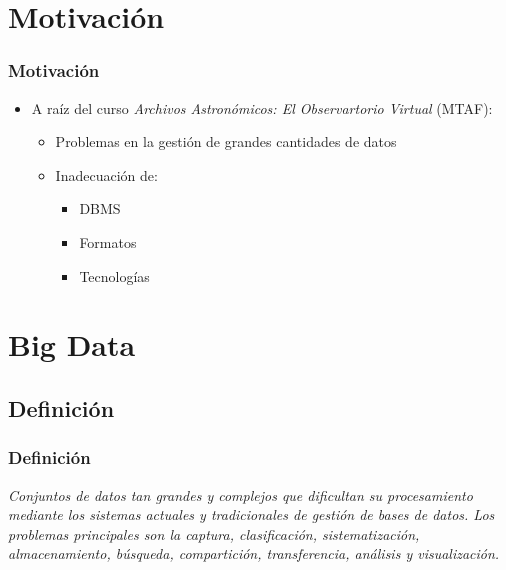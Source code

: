 \documentclass[serif,12pt]{beamer}
\begin{document}
\section{Motivación}
\begin{frame}
\frametitle{Motivación}


\begin{itemize}
\item A raíz del curso \emph{Archivos Astronómicos: El Observartorio Virtual} (MTAF):
  \begin{itemize}
  \item Problemas en la gestión de grandes cantidades de datos
  \item Inadecuación de:
    \begin{itemize}
    \item DBMS
    \item Formatos
    \item Tecnologías
    \end{itemize}
  \end{itemize}
\end{itemize}

\end{frame}


\section{Big Data}

\subsection{Definición}
\begin{frame}
\frametitle{Definición}

\begin{shaded}
\emph{Conjuntos de datos tan grandes y complejos que dificultan su procesamiento mediante los sistemas actuales y tradicionales de gestión de bases de datos. Los problemas principales son la captura, clasificación, sistematización, almacenamiento, búsqueda, compartición, transferencia, análisis y visualización.}
\end{shaded}
\end{frame}
\end{document}
